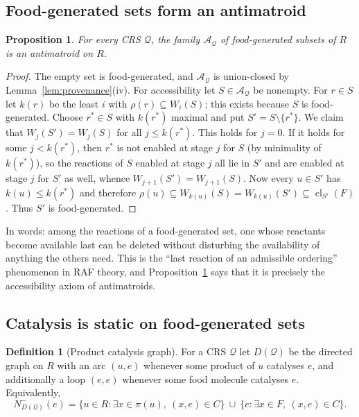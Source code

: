 \documentclass[11pt,a4paper]{article}
\theoremstyle{plain}
\newtheorem{proposition}[theorem]{Proposition}
\theoremstyle{definition}
\newtheorem{definition}[theorem]{Definition}
\theoremstyle{remark}
\newcommand{\cl}{\operatorname{cl}}
\newcommand{\cA}{\mathcal{A}}
\newcommand{\cQ}{\mathcal{Q}}
\newcommand{\Nin}{N^{-}}
\begin{document}
\subsection{Food-generated sets form an antimatroid}

\begin{proposition}\label{prop:fg-antimatroid}
For every CRS $\cQ$, the family $\cA_{\cQ}$ of food-generated subsets of $R$ is an antimatroid on $R$.
\end{proposition}

\begin{proof}
The empty set is food-generated, and $\cA_{\cQ}$ is union-closed by Lemma~\ref{lem:provenance}(iv). For accessibility let $S\in\cA_{\cQ}$ be nonempty. For $r\in S$ let $k(r)$ be the least $i$ with $\rho(r)\subseteq W_i(S)$; this exists because $S$ is food-generated. Choose $r^{*}\in S$ with $k(r^{*})$ maximal and put $S'=S\setminus\{r^{*}\}$. We claim that $W_j(S')=W_j(S)$ for all $j\le k(r^{*})$. This holds for $j=0$. If it holds for some $j<k(r^{*})$, then $r^{*}$ is not enabled at stage $j$ for $S$ (by minimality of $k(r^{*})$), so the reactions of $S$ enabled at stage $j$ all lie in $S'$ and are enabled at stage $j$ for $S'$ as well, whence $W_{j+1}(S')=W_{j+1}(S)$. Now every $u\in S'$ has $k(u)\le k(r^{*})$ and therefore $\rho(u)\subseteq W_{k(u)}(S)=W_{k(u)}(S')\subseteq\cl_{S'}(F)$. Thus $S'$ is food-generated.
\end{proof}

In words: among the reactions of a food-generated set, one whose reactants become available last can be deleted without disturbing the availability of anything the others need. This is the ``last reaction of an admissible ordering'' phenomenon in RAF theory, and Proposition~\ref{prop:fg-antimatroid} says that it is precisely the accessibility axiom of antimatroids.

\subsection{Catalysis is static on food-generated sets}

\begin{definition}[Product catalysis graph]\label{def:DQ}
For a CRS $\cQ$ let $D(\cQ)$ be the directed graph on $R$ with an arc $(u,e)$ whenever some product of $u$ catalyses $e$, and additionally a loop $(e,e)$ whenever some food molecule catalyses $e$. Equivalently,
\[
\Nin_{D(\cQ)}(e)=\{u\in R:\exists x\in\pi(u),\ (x,e)\in C\}\ \cup\ \{e: \exists x\in F,\ (x,e)\in C\}.
\]
\end{definition}
\end{document}
